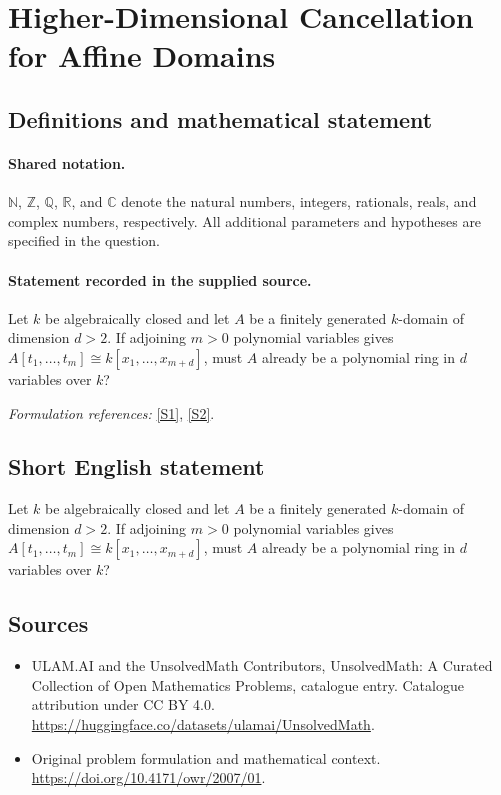 \documentclass[11pt]{article}
\newcommand{\sref}[2]{\hyperlink{source:#1:#2}{[S#2]}}
\begin{document}
\section{Higher-Dimensional Cancellation for Affine Domains}\label{statement}

\subsection{Definitions and mathematical statement}

\paragraph{Shared notation.}$\mathbb N$, $\mathbb Z$, $\mathbb Q$, $\mathbb R$, and $\mathbb C$ denote the natural numbers, integers, rationals, reals, and complex numbers, respectively. All additional parameters and hypotheses are specified in the question.


\paragraph{Statement recorded in the supplied source.}
Let $k$ be algebraically closed and let $A$ be a finitely generated $k$-domain of dimension $d>2$. If adjoining $m>0$ polynomial variables gives $A[t_1,\ldots,t_m]\cong k[x_1,\ldots,x_{m+d}]$, must $A$ already be a polynomial ring in $d$ variables over $k$?
\par\smallskip\textit{Formulation references:} \sref{statement}{1}, \sref{statement}{2}.
\subsection{Short English statement}
Let $k$ be algebraically closed and let $A$ be a finitely generated $k$-domain of dimension $d>2$. If adjoining $m>0$ polynomial variables gives $A[t_1,\ldots,t_m]\cong k[x_1,\ldots,x_{m+d}]$, must $A$ already be a polynomial ring in $d$ variables over $k$?
\subsection{Sources}
\begin{itemize}
\item[\hypertarget{source:statement:1}{S1}] ULAM.AI and the UnsolvedMath Contributors, UnsolvedMath: A Curated Collection of Open Mathematics Problems, catalogue entry. Catalogue attribution under CC BY 4.0.
\url{https://huggingface.co/datasets/ulamai/UnsolvedMath}.
\item[\hypertarget{source:statement:2}{S2}] Original problem formulation and mathematical context.
\url{https://doi.org/10.4171/owr/2007/01}.
\end{itemize}
\label{end:statement}
\end{document}
